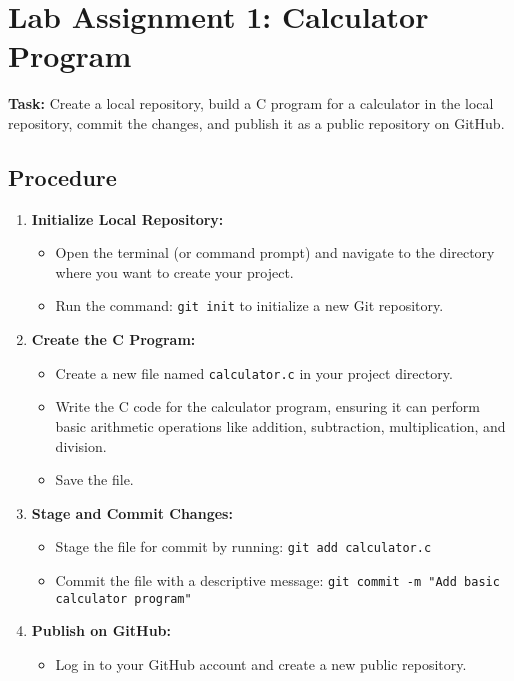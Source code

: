 \documentclass[a4paper,12pt]{article}
\begin{document}
\newpage

\tableofcontents

\newpage
\section{Lab Assignment 1: Calculator Program}
\textbf{Task:} Create a local repository, build a C program for a calculator in the local repository, commit the changes, and publish it as a public repository on GitHub.

\subsection*{Procedure}
\begin{enumerate}
    \item \textbf{Initialize Local Repository:}
    \begin{itemize}
        \item Open the terminal (or command prompt) and navigate to the directory where you want to create your project.
        \item Run the command: \texttt{git init} to initialize a new Git repository.
    \end{itemize}
    \item \textbf{Create the C Program:}
    \begin{itemize}
        \item Create a new file named \texttt{calculator.c} in your project directory.
        \item Write the C code for the calculator program, ensuring it can perform basic arithmetic operations like addition, subtraction, multiplication, and division.
        \item Save the file.
    \end{itemize}
    \item \textbf{Stage and Commit Changes:}
    \begin{itemize}
        \item Stage the file for commit by running: \texttt{git add calculator.c}
        \item Commit the file with a descriptive message: \texttt{git commit -m "Add basic calculator program"}
    \end{itemize}
    \item \textbf{Publish on GitHub:}
    \begin{itemize}
        \item Log in to your GitHub account and create a new public repository.

\end{itemize}
\end{enumerate}
\end{document}
